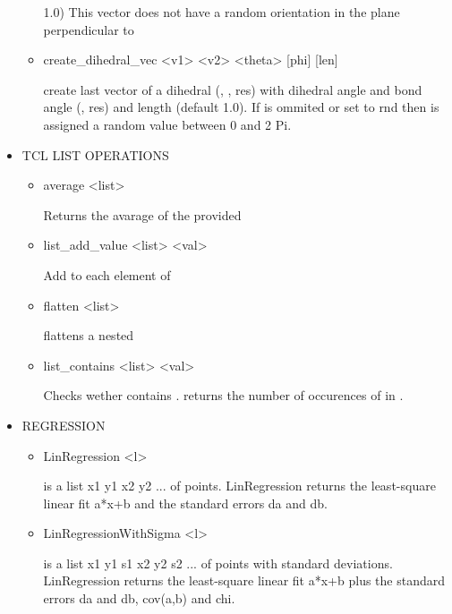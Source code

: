 \begin{itemize}
\begin{itemize}
1.0) This vector does not have a random orientation in the plane
perpendicular to 
   \item
\begin{code}
create\_dihedral\_vec <v1> <v2> <theta> [phi] [len]
\end{code}
create last vector of a dihedral (, , res) with
dihedral angle  and bond angle (, res) 
and length  (default 1.0). If  is ommited or set to
rnd then  is assigned a random value between 0 and 2 Pi.
  \end{itemize}
 \item
  TCL LIST OPERATIONS
  \begin{itemize}
   \item
\begin{code}
average <list>
\end{code}
    Returns the avarage of the provided 
   \item
\begin{code}
list\_add\_value <list> <val>
\end{code}
    Add  to each element of 
   \item
\begin{code}
flatten <list>
\end{code}
    flattens a nested 
   \item
\begin{code}
list\_contains <list> <val>
\end{code}
Checks wether  contains . returns the number of
occurences of  in .
  \end{itemize}
 \item
  REGRESSION
  \begin{itemize}
   \item
\begin{code}
LinRegression <l>
\end{code}
 is a list {{x1 y1} {x2 y2} ...} of points. LinRegression
returns the least-square linear fit a*x+b and the standard errors da
and db.
   \item
\begin{code}
LinRegressionWithSigma <l>
\end{code}
 is a list {{x1 y1 s1} {x2 y2 s2} ...} of points with standard
deviations. LinRegression returns the least-square linear fit a*x+b
plus the standard errors da and db, cov(a,b) and chi.
  \end{itemize}
\end{itemize}

